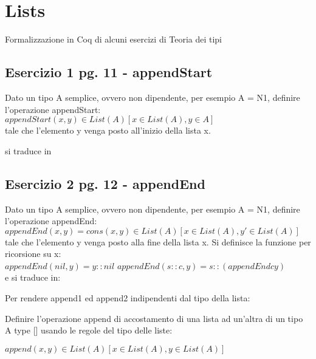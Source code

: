 \newpage
\section{Lists}

Formalizzazione in Coq di alcuni esercizi di Teoria dei tipi

\subsection{Esercizio 1 pg. 11 - appendStart}

Dato un tipo A semplice, ovvero non dipendente, per esempio A = N1, definire
l'operazione appendStart: \\

$appendStart(x, y) \in List(A) [x \in List(A), y \in A]$ \\

tale che l’elemento y venga posto all'inizio della lista x.

si traduce in



\subsection{Esercizio 2 pg. 12 - appendEnd}

Dato un tipo A semplice, ovvero non dipendente, per esempio A = N1, definire
l'operazione appendEnd: \\

$appendEnd(x, y) = cons(x, y) \in List(A) [x \in List(A), y' \in List(A)]$ \\

tale che l’elemento y venga posto alla fine della lista x.
Si definisce la funzione per ricorsione su x: \\

$appendEnd(nil, y) = y :: nil$
$appendEnd( s :: c, y) = s :: (appendEnd c y)$ \\

e si traduce in:



Per rendere append1 ed append2 indipendenti dal tipo della lista:



Definire l'operazione append di accostamento di una lista ad un'altra di un tipo
A type [] usando le regole del tipo delle liste:

$append(x,y) \in List(A) [x \in List(A), y \in List(A)]$ \\

